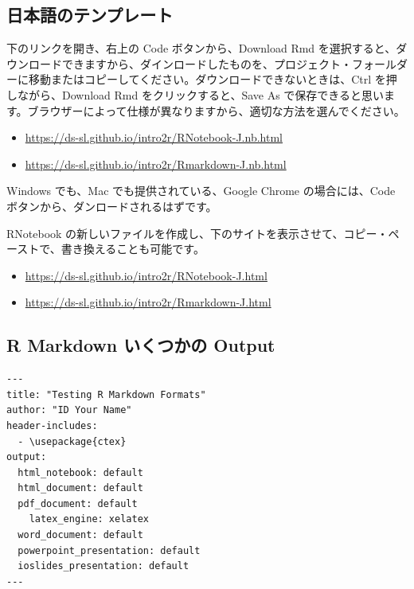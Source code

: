 \documentclass[
]{bxjsbook}
\providecommand{\tightlist}{%
  \setlength{\itemsep}{0pt}\setlength{\parskip}{0pt}}
\theoremstyle{definition}
\theoremstyle{definition}
\theoremstyle{definition}
\theoremstyle{definition}
\theoremstyle{remark}
\begin{document}
\hypertarget{ux65e5ux672cux8a9eux306eux30c6ux30f3ux30d7ux30ecux30fcux30c8}{%
\subsection{日本語のテンプレート}\label{ux65e5ux672cux8a9eux306eux30c6ux30f3ux30d7ux30ecux30fcux30c8}}

下のリンクを開き、右上の Code ボタンから、Download Rmd を選択すると、ダウンロードできますから、ダインロードしたものを、プロジェクト・フォールダーに移動またはコピーしてください。ダウンロードできないときは、Ctrl を押しながら、Download Rmd をクリックすると、Save As で保存できると思います。ブラウザーによって仕様が異なりますから、適切な方法を選んでください。

\begin{itemize}
\tightlist
\item
  \url{https://ds-sl.github.io/intro2r/RNotebook-J.nb.html}
\item
  \url{https://ds-sl.github.io/intro2r/Rmarkdown-J.nb.html}
\end{itemize}

Windows でも、Mac でも提供されている、Google Chrome の場合には、Code ボタンから、ダンロードされるはずです。

RNotebook の新しいファイルを作成し、下のサイトを表示させて、コピー・ペーストで、書き換えることも可能です。

\begin{itemize}
\tightlist
\item
  \url{https://ds-sl.github.io/intro2r/RNotebook-J.html}
\item
  \url{https://ds-sl.github.io/intro2r/Rmarkdown-J.html}
\end{itemize}

\hypertarget{r-markdown-ux3044ux304fux3064ux304bux306e-output}{%
\subsection{R Markdown いくつかの Output}\label{r-markdown-ux3044ux304fux3064ux304bux306e-output}}

\begin{verbatim}
---
title: "Testing R Markdown Formats"
author: "ID Your Name"
header-includes:
  - \usepackage{ctex}
output:
  html_notebook: default
  html_document: default
  pdf_document: default
    latex_engine: xelatex
  word_document: default
  powerpoint_presentation: default
  ioslides_presentation: default
---
\end{verbatim}
\end{document}
